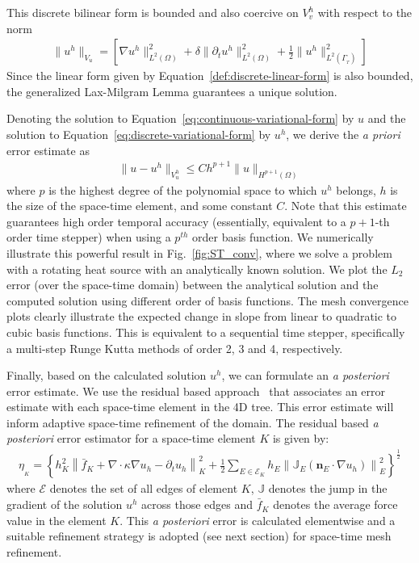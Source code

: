 This discrete bilinear form is bounded and also coercive on $V^h_v$ with respect to the norm
\begin{align}
    \|u^h\|_{V_{u}} = \left[ \nabla u^h\|^2_{L^2(\Omega)} + \delta\|\partial_t u^h\|^2_{L^2(\Omega)} + \frac{1}{2}\|u^h\|^2_{L^2(\Gamma_{_T})} \right]
\end{align}
Since the linear form given by Equation~\ref{def:discrete-linear-form} is also bounded, the generalized Lax-Milgram Lemma guarantees a unique solution. 

Denoting the solution to Equation~\ref{eq:continuous-variational-form} by $u$ and the solution to Equation~\ref{eq:discrete-variational-form} by $u^h$, we derive the \textit{a priori} error estimate as
\begin{align}\label{estimate:a-priori}
    \|u - u^h\|_{V^h_u} \leq Ch^{p+1}\|u\|_{H^{p+1}(\Omega)}
\end{align}
where $p$ is the highest degree of the polynomial space to which $u^h$ belongs, $h$ is the size of the space-time element, and some constant $C$. Note that this estimate guarantees high order temporal accuracy (essentially, equivalent to a $p+1$-th order time stepper) when using a $p^{th}$ order basis function. We numerically illustrate this powerful result in Fig.~\ref{fig:ST_conv}, where we solve a problem with a rotating heat source with an analytically known solution. We plot the $L_2$ error (over the space-time domain) between the analytical solution and the computed solution using different order of basis functions. The mesh convergence plots clearly illustrate the expected change in slope from linear to quadratic to cubic basis functions. This is equivalent to a sequential time stepper, specifically a multi-step Runge Kutta methods of order 2, 3 and 4, respectively.


Finally, based on the calculated solution $u^h$, we can formulate an \textit{a posteriori} error estimate. We use the residual based approach~\cite{ainsworth_oden, verfurth2013} that associates an error estimate with each space-time element in the 4D tree. This error estimate will inform adaptive space-time refinement of the domain. The residual based \textit{a posteriori} error estimator for a space-time element $K$ is given by:
\begin{align}
    \eta_{_K}=\left\{h_K^2 \left\| \bar{f}_K+\nabla\cdot\kappa\nabla u_h - {\partial_t u_h}\right\|_K^2+\frac{1}{2}\sum_{E\in\mathcal{E}_{K}}h_E\left\|\mathbb{J}_E(\mathbf{n}_E\cdot\nabla u_h)\right\|_E^2\right\}^\frac{1}{2}
\end{align}
where $\mathcal{E}$ denotes the set of all edges of element $K$, $\mathbb{J}$ denotes the jump in the gradient of the solution $u^h$ across those edges and $\bar{f}_K$ denotes the average force value in the element $K$. This \textit{a posteriori} error is calculated elementwise and a suitable refinement strategy is adopted (see next section) for space-time mesh refinement. 

